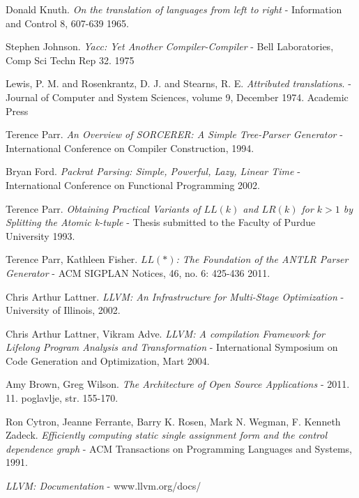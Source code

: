 \begin{thebibliography}{9}

   

	Donald Knuth.
	\emph{On the translation of languages from left to right}
	- Information and Control 8, 607-639
	1965.

	Stephen Johnson.
	\emph{Yacc: Yet Another Compiler-Compiler}
	- Bell Laboratories, Comp Sci Techn Rep 32. 
	1975

	Lewis, P. M. and Rosenkrantz, D. J. and Stearns, R. E.
	\emph{Attributed translations}.
	- Journal of Computer and System Sciences, 
	volume 9,
	December 1974.
	Academic Press

	Terence Parr.
	\emph{An Overview of SORCERER: A Simple Tree-Parser Generator}
	- International Conference on Compiler Construction,
	1994.

	Bryan Ford.
	\emph{Packrat Parsing: Simple, Powerful, Lazy, Linear Time}
	-  International Conference on Functional Programming
	2002.

	Terence Parr.
	\emph{Obtaining Practical Variants of $LL(k)$ and $LR(k)$ for $k>1$ by Splitting the Atomic k-tuple}
	- Thesis submitted to the Faculty of Purdue University
	1993.

	Terence Parr, Kathleen Fisher.
	\emph{$LL(*)$: The Foundation of the ANTLR Parser Generator}
	- ACM SIGPLAN Notices, 46, no. 6: 425-436
	2011.

%

	Chris Arthur Lattner.
	\emph{LLVM: An Infrastructure for Multi-Stage Optimization}
	- University of Illinois, 2002.
	
	Chris Arthur Lattner, Vikram Adve.
	\emph{LLVM: A compilation Framework for Lifelong Program Analysis and Transformation}
	- International Symposium on Code Generation and Optimization, Mart 2004.
	
	Amy Brown, Greg Wilson.
	\emph{The Architecture of Open Source Applications}
	- 2011. 11. poglavlje, str. 155-170. 

	Ron Cytron, Jeanne Ferrante, Barry K. Rosen, Mark N. Wegman, F. Kenneth Zadeck.
	\emph{Efficiently computing static single assignment form and the control dependence graph}
	- ACM Transactions on Programming Languages and Systems, 1991. 


	\emph{LLVM: Documentation}
	- www.llvm.org/docs/

\end{thebibliography}